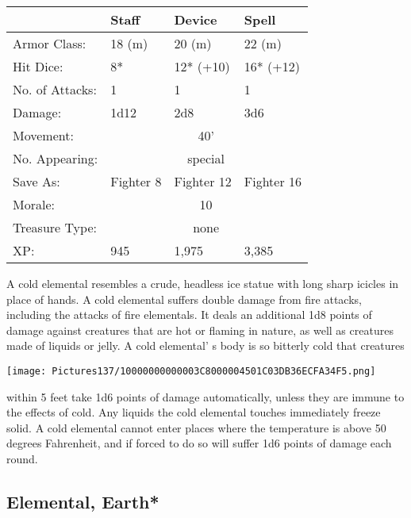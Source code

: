 \documentclass[a4paper,twoside,openany,10pt]{book}
\begin{document}
\begin{multicols}{2}
\begin{tabularx}{0.48\textwidth}{@{}lllX@{}}
& Staff & Device & Spell \\\hline
Armor Class: & 18 (m) & 20 (m) & 22 (m) \\\hline
Hit Dice: & 8* & 12* (+10) & 16* (+12) \\\hline
No. of Attacks: & 1 & 1 & 1 \\\hline
Damage: & 1d12 & 2d8 & 3d6 \\\hline
Movement: & \multicolumn{3}{c}{40'} \\\hline
No. Appearing: &\multicolumn{3}{c}{special} \\\hline
Save As: & Fighter 8 & Fighter 12 & Fighter 16 \\\hline
Morale: & \multicolumn{3}{c}{10} \\\hline
Treasure Type: & \multicolumn{3}{c}{none} \\\hline
XP: & 945 & 1,975 & 3,385 \\\hline
\end{tabularx}\medskip

A cold elemental resembles a crude, headless ice statue with long sharp icicles in place of hands. A cold elemental suffers double damage from fire attacks, including the attacks of fire elementals. It deals an additional 1d8 points of damage against creatures that are hot or flaming in nature, as well as creatures made of liquids or jelly. A cold elemental' s body is so bitterly cold that creatures

\begin{center}
	\texttt{[image: Pictures137/10000000000003C8000004501C03DB36ECFA34F5.png]}
\end{center}

within 5 feet take 1d6 points of damage automatically, unless they are immune to the effects of cold. Any liquids the cold elemental touches immediately freeze solid. A cold elemental cannot enter places where the temperature is above 50 degrees Fahrenheit, and if forced to do so will suffer 1d6 points of damage each round.


\subsection*{Elemental, Earth*}\label{elemental-earth}


\end{multicols}
\end{document}
